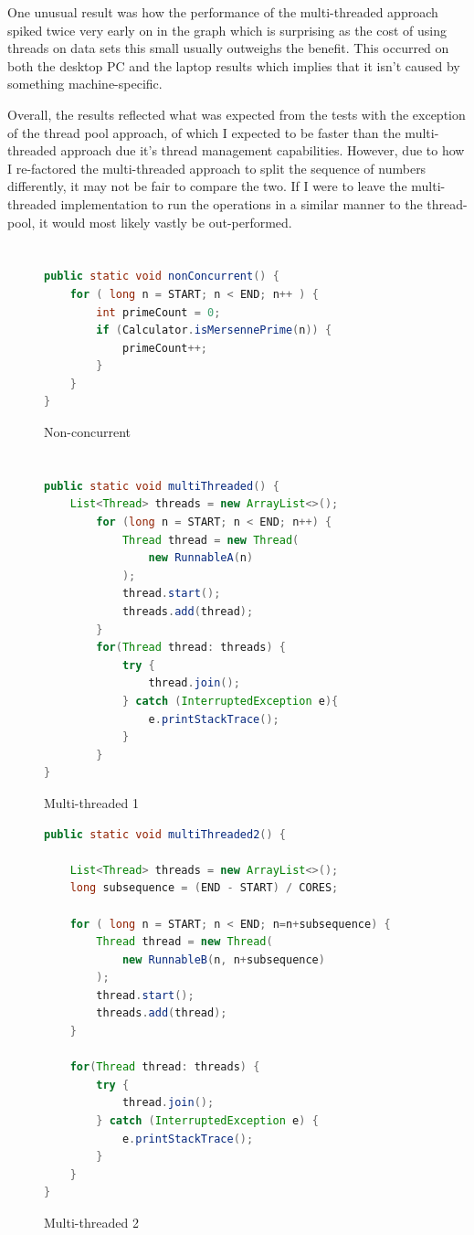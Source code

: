 \documentclass[]{report}
\begin{document}
One unusual result was how the performance of the multi-threaded approach spiked twice very early on in the graph which is surprising as the cost of using threads on data sets this small usually outweighs the benefit. This occurred on both the desktop PC and the laptop results which implies that it isn't caused by something machine-specific. 

Overall, the results reflected what was expected from the tests with the exception of the thread pool approach, of which I expected to be faster than the multi-threaded approach due it's thread management capabilities. However, due to how I re-factored the multi-threaded approach to split the sequence of numbers differently, it may not be fair to compare the two. If I were to leave the multi-threaded implementation to run the operations in a similar manner to the thread-pool, it would most likely vastly be out-performed.

\appendix
\chapter{}
\begin{figure}[h!]
	\caption{Non-concurrent}
	\begin{lstlisting}[language=Java,frame=single]
public static void nonConcurrent() {
	for ( long n = START; n < END; n++ ) {
		int primeCount = 0;
		if (Calculator.isMersennePrime(n)) {
			primeCount++;
		}
	}
}
	\end{lstlisting}
\end{figure}

\chapter{}
\begin{figure}[h!]
	\caption{Multi-threaded 1}
	\begin{lstlisting}[language=Java,frame=single]
public static void multiThreaded() {
	List<Thread> threads = new ArrayList<>();
		for (long n = START; n < END; n++) {
			Thread thread = new Thread(
				new RunnableA(n)
			);
			thread.start();
			threads.add(thread);
		}
		for(Thread thread: threads) {
			try {
				thread.join();
			} catch (InterruptedException e){
				e.printStackTrace();
			}
		}
}
	\end{lstlisting}
\end{figure}

\begin{figure}[h!]
	\caption{Multi-threaded 2}
	\begin{lstlisting}[language=Java,frame=single]
public static void multiThreaded2() {

	List<Thread> threads = new ArrayList<>();
	long subsequence = (END - START) / CORES;
	
	for ( long n = START; n < END; n=n+subsequence) {
		Thread thread = new Thread(
			new RunnableB(n, n+subsequence)
		);
		thread.start();
		threads.add(thread);
	}
	
	for(Thread thread: threads) {
		try {
			thread.join();
		} catch (InterruptedException e) {
			e.printStackTrace();
		}
	}
}
	\end{lstlisting}
\end{figure}
\end{document}
